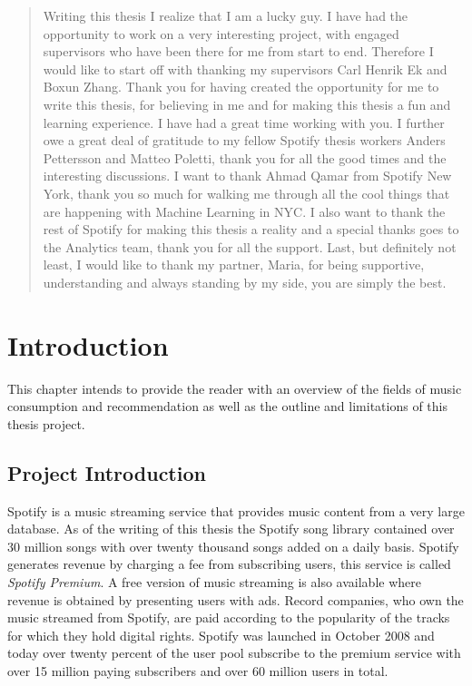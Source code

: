 \documentclass[a4paper,11pt]{kth-mag}
\begin{document}
\clearpage
\renewcommand{\abstractname}{Acknowledgements}
\begin{abstract}
 Writing this thesis I realize that I am a lucky guy. I have had the opportunity to work on a very interesting project, with engaged supervisors who have been there for me from start to end. Therefore I would like to start off with thanking my supervisors Carl Henrik Ek and Boxun Zhang. Thank you for having created the opportunity for me to write this thesis, for believing in me and for making this thesis a fun and learning experience. I have had a great time working with you. I further owe a great deal of gratitude to my fellow Spotify thesis workers Anders Pettersson and Matteo Poletti, thank you for all the good times and the interesting discussions. I want to thank Ahmad Qamar from Spotify New York, thank you so much for walking me through all the cool things that are happening with Machine Learning in NYC. I also want to thank the rest of Spotify for making this thesis a reality and a special thanks goes to the Analytics team, thank you for all the support.  Last, but definitely not least, I would like to thank my partner, Maria, for being supportive, understanding and always standing by my side, you are simply the best.
\end{abstract}
  

\clearpage
\tableofcontents*
\mainmatter
\pagestyle{newchap}
\chapter{Introduction}
This chapter intends  to provide the reader with an overview of the fields of music consumption and recommendation as well as the outline and limitations of this thesis project.

\section{Project Introduction}
Spotify is a music streaming service that provides music content from a very large database. As of the writing of this thesis the Spotify song library contained over 30 million songs with over twenty thousand songs added on a daily basis\cite{spotifyPress}. Spotify generates revenue by charging a fee from subscribing users, this service is called \textit{Spotify Premium}. A free version of music streaming is also available where revenue is obtained by presenting users with ads. Record companies, who own the music streamed from Spotify, are paid according to the popularity of the tracks for which they hold digital rights. Spotify was launched in October 2008 and today over twenty percent of the user pool subscribe to the premium service with over 15 million paying subscribers and over 60 million users in total\cite{spotifyPress}.
\end{document}
